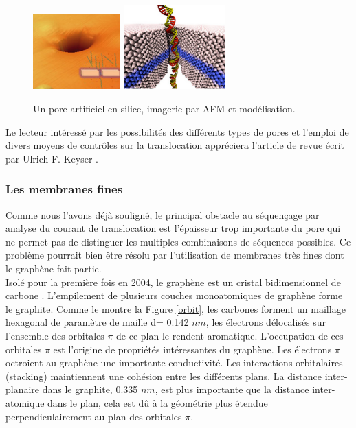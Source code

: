 \documentclass[a4paper,11pt]{article}
\begin{document}
\begin{figure}[H]
\begin{center}
\includegraphics[width=0.3\textwidth]{artificialpore.png} \hspace{0.02\textwidth}
\includegraphics[width=0.35\textwidth]{nanoporeart.jpg}

\caption{Un pore artificiel en silice, imagerie par AFM et modélisation.}
\label{artificialpore}
\end{center}
\end{figure}

Le lecteur intéressé par les possibilités des différents types de pores et l'emploi de divers moyens de contrôles sur la translocation appréciera l'article de revue écrit par Ulrich F. Keyser \cite{keyser}. 




\subsubsection{Les membranes fines}

Comme nous l'avons déjà souligné, le principal obstacle au séquençage par analyse du courant de translocation est l'épaisseur trop importante du pore qui ne permet pas de distinguer les multiples combinaisons de séquences possibles. Ce problème pourrait bien être résolu par l'utilisation de membranes très fines dont le graphène fait partie.\\

Isolé pour la première fois en 2004, le graphène est un cristal bidimensionnel de carbone \cite{graph}. L'empilement de plusieurs couches monoatomiques de graphène forme le graphite. Comme le montre la Figure \ref{orbit}, les carbones forment un maillage hexagonal de paramètre de maille d= 0.142 $nm$, les électrons délocalisés sur l'ensemble des orbitales $\pi$ de ce plan le rendent aromatique. L'occupation de ces orbitales $\pi$ est l'origine de propriétés intéressantes du graphène. Les électrons $\pi$ octroient au graphène une importante conductivité. Les interactions orbitalaires (stacking) maintiennent une cohésion entre les différents plans. La distance inter-planaire dans le graphite, 0.335 $nm$, est plus importante que la distance inter-atomique dans le plan, cela est dû à la géométrie plus étendue perpendiculairement au plan des orbitales $\pi$.
\end{document}
